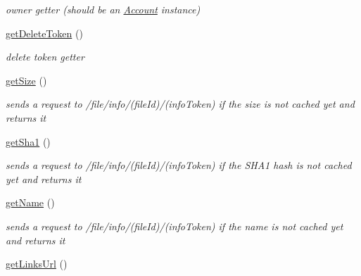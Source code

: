 \begin{DoxyCompactItemize}
\begin{DoxyCompactList}\small\item\em owner getter (should be an \hyperlink{classAccount}{Account} instance) \end{DoxyCompactList}\item 
\hypertarget{classFile_adc2fcd31a241309a958d11967c146be4}{
\hyperlink{classFile_adc2fcd31a241309a958d11967c146be4}{getDeleteToken} ()}
\label{classFile_adc2fcd31a241309a958d11967c146be4}

\begin{DoxyCompactList}\small\item\em delete token getter \end{DoxyCompactList}\item 
\hypertarget{classFile_a32fad9fa9d249c403deb502bf9ac5463}{
\hyperlink{classFile_a32fad9fa9d249c403deb502bf9ac5463}{getSize} ()}
\label{classFile_a32fad9fa9d249c403deb502bf9ac5463}

\begin{DoxyCompactList}\small\item\em sends a request to /file/info/(fileId)/(infoToken) if the size is not cached yet and returns it \end{DoxyCompactList}\item 
\hypertarget{classFile_ac91ce6dc57dd0f2aee93be7fa5ef895b}{
\hyperlink{classFile_ac91ce6dc57dd0f2aee93be7fa5ef895b}{getSha1} ()}
\label{classFile_ac91ce6dc57dd0f2aee93be7fa5ef895b}

\begin{DoxyCompactList}\small\item\em sends a request to /file/info/(fileId)/(infoToken) if the SHA1 hash is not cached yet and returns it \end{DoxyCompactList}\item 
\hypertarget{classFile_a3fa9782957fc41467358e7295ca4ea74}{
\hyperlink{classFile_a3fa9782957fc41467358e7295ca4ea74}{getName} ()}
\label{classFile_a3fa9782957fc41467358e7295ca4ea74}

\begin{DoxyCompactList}\small\item\em sends a request to /file/info/(fileId)/(infoToken) if the name is not cached yet and returns it \end{DoxyCompactList}\item 
\hypertarget{classFile_a475cf491edd73fc52d6bc8f9ad747d6c}{
\hyperlink{classFile_a475cf491edd73fc52d6bc8f9ad747d6c}{getLinksUrl} ()}
\label{classFile_a475cf491edd73fc52d6bc8f9ad747d6c}


\end{DoxyCompactItemize}

